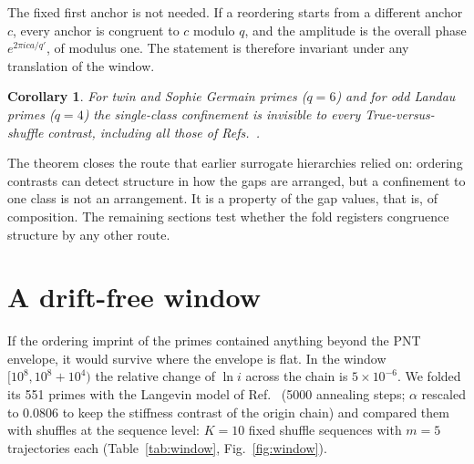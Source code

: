 \documentclass[reprint,amsmath,amssymb,aps,pre,longbibliography]{revtex4-2}
\newtheorem{corollary}{Corollary}
\begin{document}
\noindent The fixed first anchor is not needed. If a reordering starts from a different anchor
$c$, every anchor is congruent to $c$ modulo $q$, and the amplitude is the overall phase
$e^{2\pi i ca/q'}$, of modulus one. The statement is therefore invariant under any translation
of the window.

\begin{corollary}
For twin and Sophie Germain primes ($q=6$) and for odd Landau primes ($q=4$) the single-class
confinement is invisible to every True-versus-shuffle contrast, including all those of
Refs.~\cite{PDTP4,Merged}.
\end{corollary}

The theorem closes the route that earlier surrogate hierarchies relied on: ordering contrasts can
detect structure in how the gaps are arranged, but a confinement to one class is not an
arrangement. It is a property of the gap values, that is, of composition. The remaining sections
test whether the fold registers congruence structure by any other route.

\section{A drift-free window}\label{sec:window}

If the ordering imprint of the primes contained anything beyond the PNT envelope, it would survive
where the envelope is flat. In the window $[10^8,10^8+10^4)$ the relative change of $\ln i$ across
the chain is $5\times10^{-6}$. We folded its 551 primes with the Langevin model of
Ref.~\cite{PDTP4} (5000 annealing steps; $\alpha$ rescaled to $0.0806$ to keep the stiffness
contrast of the origin chain) and compared them with shuffles at the sequence level: $K=10$ fixed
shuffle sequences with $m=5$ trajectories each (Table~\ref{tab:window},
Fig.~\ref{fig:window}).
\end{document}
